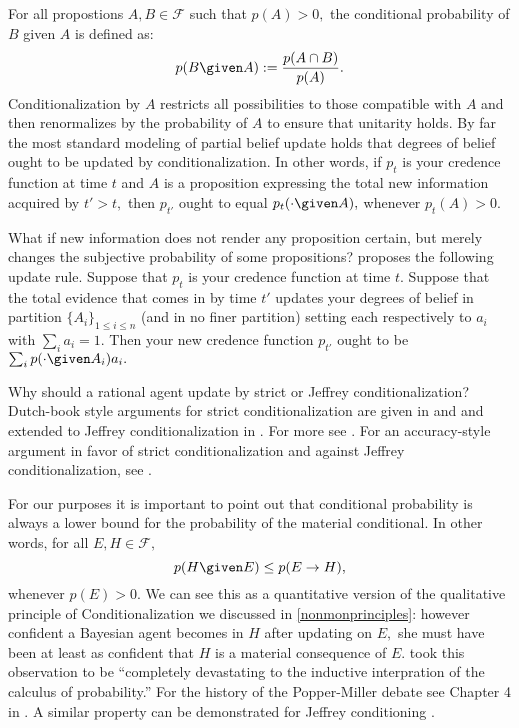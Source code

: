 For all propostions $A,B\in \mathcal{F}$ such that $p(A)>0,$ the conditional
probability of $B$ given $A$ is defined as: $$p(B \given A) := \frac{p(A\cap
B)}{p(A)}.$$ Conditionalization by $A$ restricts all possibilities to those
compatible with $A$ and then renormalizes by the probability of $A$ to ensure
that unitarity holds. By far the most standard modeling of partial belief update
holds that degrees of belief ought to be updated by conditionalization. In other
words, if $p_t$ is your credence function at time $t$ and $A$ is a proposition
expressing the total new information acquired by $t'>t,$ then $p_{t'}$ ought to
equal $p_t(\cdot \given A),$ whenever $p_t(A)>0.$

What if new information does not render any proposition certain, but merely
changes the subjective probability of some propositions?
\citet{jeffrey1983logic} proposes the following update rule. Suppose that $p_t$
is your credence function at time $t$. Suppose that the total evidence that
comes in by time $t'$ updates your degrees of belief in partition
$\{A_i\}_{1\leq i \leq n}$ (and in no finer partition) setting each respectively
to $a_i$ with $\sum_i a_i = 1.$ Then your new credence function $p_{t'}$ ought
to be $\sum_i p(\cdot \given A_i) a_i.$ 

Why should a rational agent update by strict or Jeffrey conditionalization?
Dutch-book style arguments for strict conditionalization are given in
\citet{teller1973conditionalization} and \citet{lewis1999why} and extended to
Jeffrey conditionalization in \citet{armendt1980isthere}. For more see
\citet{skyrms2006diachronic}. For an accuracy-style argument in favor of strict
conditionalization and against Jeffrey conditionalization, see
\citet{leitgeb2010objective}.

For our purposes it is important to point out that conditional probability is
always a lower bound for the probability of the material conditional. In other
words, for all $E,H\in \mathcal{F},$ $$p(H \given E)\leq p(E\rightarrow H),$$
whenever $p(E)>0$. We can see this as a quantitative version of the qualitative
principle of Conditionalization we discussed in \autoref{nonmonprinciples}:
however confident a Bayesian agent becomes in $H$ after updating on $E,$ she
must have been at least as confident that $H$ is a material consequence of $E$.
\citet{popper1983proof} took this observation to be ``completely devastating to
the inductive interpration of the calculus of probability.'' For the history of
the Popper-Miller debate see Chapter 4 in \citet{earman1992bayes}. A similar
property can be demonstrated for Jeffrey conditioning
\citep{genin2017howinductive}.

